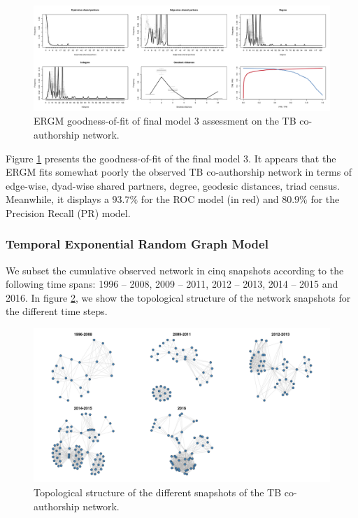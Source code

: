 \begin{figure}[!h]
\centering
\hspace*{-1cm}
\includegraphics[scale=0.4]{Chapters/tb/statMod/tb_ergm_gof2}
\caption{ERGM goodness-of-fit of final model 3 assessment on the TB co-authorship network.%
}
\label{fig:tb_ergm-gof}
\end{figure}

Figure \ref{fig:tb_ergm-gof} presents the goodness-of-fit of the final model 3. It appears that the ERGM fits somewhat poorly the observed TB co-authorship network in terms of edge-wise, dyad-wise shared partners, degree, geodesic distances, triad census. Meanwhile, it displays a $93.7\%$ for the ROC model (in red) and $80.9\%$ for the Precision Recall (PR) model.

\subsubsection{Temporal Exponential Random Graph Model}
\label{sec:tb_results_tergm}
We subset the cumulative observed network in cinq snapshots according to the following time spans: 1996 -- 2008, 2009 -- 2011, 2012 -- 2013, 2014 -- 2015 and 2016. In figure \ref{fig:tb_dynNetwork}, we show the topological structure of the network snapshots for the different time steps.

\begin{figure}[!ht]
\hspace{-1.25cm}
\includegraphics[scale=0.4]{Chapters/tb/statMod/tb_dynNetwork}
\caption{Topological structure of the different snapshots of the TB co-authorship network.}
\label{fig:tb_dynNetwork}
\end{figure}

